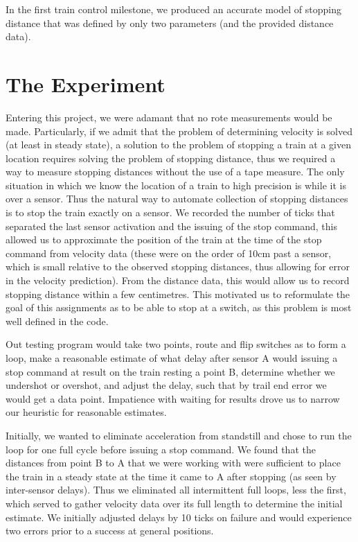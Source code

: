 \documentclass{amsart}
\begin{document}
In the first train control milestone, we produced an accurate model of stopping distance that was defined by only two parameters (and the provided distance data).

\section*{The Experiment}


Entering this project, we were adamant that no rote measurements would be made. Particularly, if we admit that the problem of determining velocity is solved (at least in steady state), a solution to the problem of stopping a train at a given location requires solving the problem of stopping distance, thus we required a way to measure stopping distances without the use of a tape measure. The only situation in which we know the location of a train to high precision is while it is over a sensor. Thus the natural way to automate collection of stopping distances is to stop the train exactly on a sensor. We recorded the number of ticks that separated the last sensor activation and the issuing of the stop command, this allowed us to approximate the position of the train at the time of the stop command from velocity data (these were on the order of 10cm past a sensor, which is small relative to the observed stopping distances, thus allowing for error in the velocity prediction). From the distance data, this would allow us to record stopping distance within a few centimetres. This motivated us to reformulate the goal of this assignments as to be able to stop at a switch, as this problem is most well defined in the code.

Out testing program would take two points, route and flip switches as to form a loop, make a reasonable estimate of what delay after sensor A would issuing a stop command at result on the train resting a point B, determine whether we undershot or overshot, and adjust the delay, such that by trail end error we would get a data point. Impatience with waiting for results drove us to narrow our heuristic for reasonable estimates.

Initially, we wanted to eliminate acceleration from standstill and chose to run the loop for one full cycle before issuing a stop command. We found that the distances from point B to A that we were working with were sufficient to place the train in a steady state at the time it came to A after stopping (as seen by inter-sensor delays). Thus we eliminated all intermittent full loops, less the first, which served to gather velocity data over its full length to determine the initial estimate. We initially adjusted delays by 10 ticks on failure and would experience two errors prior to a success at general positions.
\end{document}
